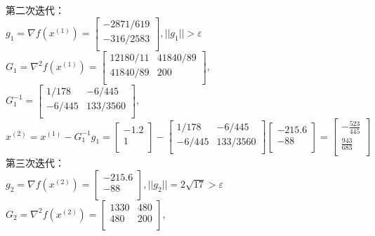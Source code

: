 \begin{solution}
    第二次迭代：\\
    $g_1=\nabla f(x^{(1)})=\begin{bmatrix} -2871/619\\-316/2583\\\end{bmatrix},||g_1||>\varepsilon$\\
    $G_1=\nabla^2 f(x^{(1)})=\begin{bmatrix}
        12180/11 & 41840/89\\
        41840/89 & 200\\
    \end{bmatrix},$\\
    $G_1^{-1}=\begin{bmatrix}
        1/178 & -6/445\\
        -6/445 & 133/3560\\
    \end{bmatrix},$\\
    $x^{(2)}=x^{(1)}-G_1^{-1}g_1=\begin{bmatrix} -1.2\\1\\\end{bmatrix}-\begin{bmatrix}
        1/178 & -6/445\\
        -6/445 & 133/3560\\
    \end{bmatrix}\begin{bmatrix} -215.6\\-88\\\end{bmatrix}=\begin{bmatrix} -\frac{523}{445}\\\frac{943}{683}\\\end{bmatrix}$\\
    第三次迭代：\\
    $g_2=\nabla f(x^{(2)})=\begin{bmatrix} -215.6\\-88\\\end{bmatrix},||g_2||=2\sqrt{17}>\varepsilon$\\
    $G_2=\nabla^2 f(x^{(2)})=\begin{bmatrix}
        1330 & 480\\
        480 & 200\\
    \end{bmatrix},$\\

\end{solution}
